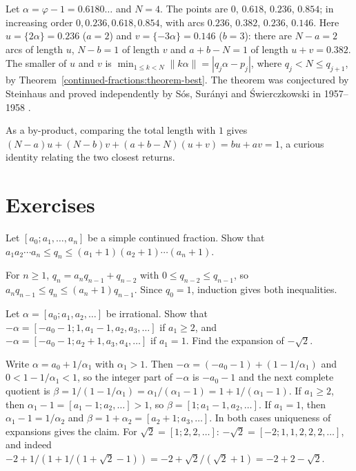 \begin{example}\label{continued-fractions:example-three-gap}
Let $\alpha = \varphi - 1 = 0.6180\ldots$ and $N = 4$. The points are $0$, $0.618$, $0.236$, $0.854$; in increasing order $0, 0.236, 0.618, 0.854$, with arcs $0.236$, $0.382$, $0.236$, $0.146$. Here
$u = \{2\alpha\} = 0.236$ ($a = 2$) and $v = \{-3\alpha\} = 0.146$ ($b = 3$): there are $N - a = 2$ arcs of length $u$, $N - b = 1$ of length $v$ and $a + b - N = 1$ of length $u + v = 0.382$. The
smaller of $u$ and $v$ is $\min_{1 \leq k < N}\lVert k\alpha \rVert = |q_j\alpha - p_j|$, where $q_j < N \leq q_{j+1}$, by Theorem~\ref{continued-fractions:theorem-best}. The theorem was conjectured by Steinhaus
and proved independently by Sós, Surányi and Świerczkowski in 1957--1958 \cite{sos-1958}.
\end{example}

As a by-product, comparing the total length with $1$ gives $(N - a)u + (N - b)v + (a + b - N)(u + v) = bu + av = 1$, a curious identity relating the two closest returns.

\section{Exercises}\label{continued-fractions:section-exercises}

\begin{exercise}\label{continued-fractions:exercise-denominator-bounds}
Let $[a_0; a_1, \ldots, a_n]$ be a simple continued fraction. Show that $a_1a_2\cdots a_n \leq q_n \leq (a_1 + 1)(a_2 + 1)\cdots(a_n + 1)$.
\end{exercise}

\begin{solution}
For $n \geq 1$, $q_n = a_nq_{n-1} + q_{n-2}$ with $0 \leq q_{n-2} \leq q_{n-1}$, so $a_nq_{n-1} \leq q_n \leq (a_n + 1)q_{n-1}$. Since $q_0 = 1$, induction gives both inequalities.
\end{solution}

\begin{exercise}\label{continued-fractions:exercise-negative}
Let $\alpha = [a_0; a_1, a_2, \ldots]$ be irrational. Show that $-\alpha = [-a_0 - 1; 1, a_1 - 1, a_2, a_3, \ldots]$ if $a_1 \geq 2$, and $-\alpha = [-a_0 - 1; a_2 + 1, a_3, a_4, \ldots]$ if
$a_1 = 1$. Find the expansion of $-\sqrt2$.
\end{exercise}

\begin{solution}
Write $\alpha = a_0 + 1/\alpha_1$ with $\alpha_1 > 1$. Then $-\alpha = (-a_0 - 1) + (1 - 1/\alpha_1)$ and $0 < 1 - 1/\alpha_1 < 1$, so the integer part of $-\alpha$ is $-a_0 - 1$ and the next complete
quotient is $\beta = 1/(1 - 1/\alpha_1) = \alpha_1/(\alpha_1 - 1) = 1 + 1/(\alpha_1 - 1)$. If $a_1 \geq 2$, then $\alpha_1 - 1 = [a_1 - 1; a_2, \ldots] > 1$, so $\beta = [1; a_1 - 1, a_2, \ldots]$. If
$a_1 = 1$, then $\alpha_1 - 1 = 1/\alpha_2$ and $\beta = 1 + \alpha_2 = [a_2 + 1; a_3, \ldots]$. In both cases uniqueness of expansions gives the claim. For $\sqrt2 = [1; 2, 2, \ldots]$:
$-\sqrt2 = [-2; 1, 1, 2, 2, 2, \ldots]$, and indeed $-2 + 1/(1 + 1/(1 + \sqrt2 - 1)) = -2 + \sqrt2/(\sqrt2 + 1) = -2 + 2 - \sqrt2$.
\end{solution}

